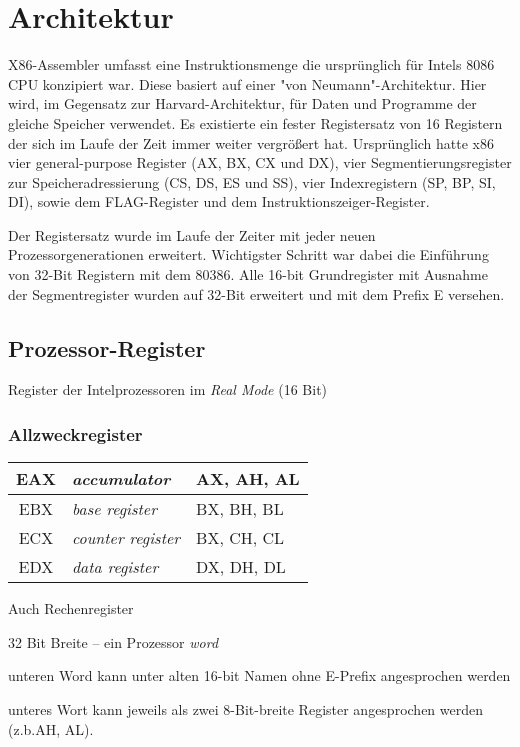 \section{Architektur}
X86-Assembler umfasst eine Instruktionsmenge die ursprünglich für Intels 8086 CPU konzipiert war. Diese basiert auf einer "von Neumann"-Architektur. Hier wird, im Gegensatz zur Harvard-Architektur, für Daten und Programme der gleiche Speicher verwendet. Es existierte ein fester Registersatz von 16 Registern der sich im Laufe der Zeit immer weiter vergrößert hat. Ursprünglich hatte x86 vier general-purpose Register (AX, BX, CX und DX), vier Segmentierungsregister zur Speicheradressierung (CS, DS, ES und SS), vier Indexregistern (SP, BP, SI, DI), sowie dem FLAG-Register und dem Instruktionszeiger-Register.

Der Registersatz wurde im Laufe der Zeiter mit jeder neuen Prozessorgenerationen erweitert. Wichtigster Schritt war dabei die Einführung von 32-Bit Registern mit dem 80386. Alle 16-bit Grundregister mit Ausnahme der Segmentregister wurden auf 32-Bit erweitert und mit dem Prefix E versehen.

\subsection{Prozessor-Register}

Register der Intelprozessoren im \emph{Real Mode} (16 Bit)



\subsubsection{Allzweckregister}

\begin{tabular}{|c|l|l|}
\hline EAX & \emph{accumulator} & AX, AH, AL
\\
\hline EBX & \emph{base register} & BX, BH, BL
\\
\hline ECX & \emph{counter register} & BX, CH, CL
\\
\hline EDX & \emph{data register} & DX, DH, DL
\\
\hline \end{tabular}

Auch Rechenregister

32 Bit Breite – ein Prozessor \emph{word}

unteren Word kann unter alten 16-bit Namen ohne E-Prefix angesprochen werden

unteres Wort kann jeweils als zwei 8-Bit-breite Register angesprochen werden (z.b.AH, AL).

